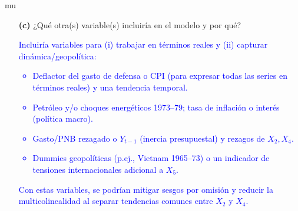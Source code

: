 mu\documentclass[10pt]{article}
\begin{document}
\begin{enumerate}
    \item[\textbf{(c)}] ¿Qué otra(s) variable(s) incluiría en el modelo y por qué?\\
    \textcolor{blue}{
        Incluiría variables para (i) trabajar en términos reales y (ii) capturar dinámica/geopolítica:
        \begin{itemize}
        \item Deflactor del gasto de defensa o CPI (para expresar todas las series en términos reales) y una tendencia temporal.
        \item Petróleo y/o choques energéticos 1973–79; tasa de inflación o interés (política macro).
        \item Gasto/PNB rezagado o \(Y_{t-1}\) (inercia presupuestal) y rezagos de \(X_2, X_4\).
        \item Dummies geopolíticas (p.ej., Vietnam 1965–73) o un indicador de tensiones internacionales adicional a \(X_5\).
        \end{itemize}
        Con estas variables, se podrían mitigar sesgos por omisión y reducir la multicolinealidad al separar tendencias comunes entre \(X_2\) y \(X_4\).
    }
\end{enumerate}
\end{document}
